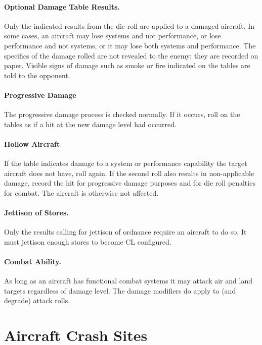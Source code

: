 \begin{advancedrules}
\paragraph{Optional Damage Table Results.} Only the indicated results from the die roll are applied to a damaged aircraft. In some cases, an aircraft may lose systems and not performance, or lose performance and not systems, or it may lose both systems and performance. The specifics of the damage rolled are not revealed to the enemy; they are recorded on paper. Visible signs of damage such as smoke or fire indicated on the tables are told to the opponent.

\paragraph{Progressive Damage} The progressive damage process is checked normally. If it occurs, roll on the tables as if a hit at the new damage level had occurred.

\paragraph{Hollow Aircraft} If the table indicates damage to a system or performance capability the target aircraft does not have, roll again. If the second roll also results in non-applicable damage, record the hit for progressive damage purposes and for die roll penalties for combat. The aircraft is otherwise not affected.

\paragraph{Jettison of Stores.} Only the results calling for jettison of ordnance require an aircraft to do so. It must jettison enough stores to become CL configured.

\paragraph{Combat Ability.} As long as an aircraft has functional combat systems it may attack air and land targets regardless of damage level. The damage modifiers do apply to (and degrade) attack rolls.


\section{Aircraft Crash Sites}



\end{advancedrules}
